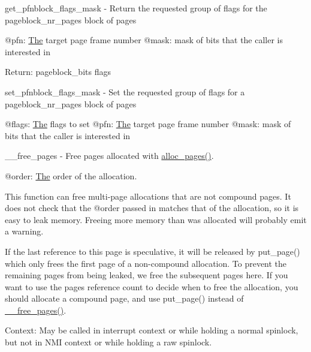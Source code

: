 get\+\_\+pfnblock\+\_\+flags\+\_\+mask -\/ Return the requested group of flags for the pageblock\+\_\+nr\+\_\+pages block of pages

@pfn\+: \mbox{\hyperlink{classThe}{The}} target page frame number @mask\+: mask of bits that the caller is interested in

Return\+: pageblock\+\_\+bits flags

set\+\_\+pfnblock\+\_\+flags\+\_\+mask -\/ Set the requested group of flags for a pageblock\+\_\+nr\+\_\+pages block of pages

@flags\+: \mbox{\hyperlink{classThe}{The}} flags to set @pfn\+: \mbox{\hyperlink{classThe}{The}} target page frame number @mask\+: mask of bits that the caller is interested in

\+\_\+\+\_\+free\+\_\+pages -\/ Free pages allocated with \mbox{\hyperlink{mempolicy_8c_add7a36e6a0c552051c3453df754b9c7b}{alloc\+\_\+pages()}}.

@order\+: \mbox{\hyperlink{classThe}{The}} order of the allocation.

This function can free multi-\/page allocations that are not compound pages. It does not check that the @order passed in matches that of the allocation, so it is easy to leak memory. Freeing more memory than was allocated will probably emit a warning.

If the last reference to this page is speculative, it will be released by put\+\_\+page() which only frees the first page of a non-\/compound allocation. To prevent the remaining pages from being leaked, we free the subsequent pages here. If you want to use the page\textquotesingle{}s reference count to decide when to free the allocation, you should allocate a compound page, and use put\+\_\+page() instead of \mbox{\hyperlink{page__alloc_8c_a09a84df4c6cb817075a2eece7c7c0345}{\+\_\+\+\_\+free\+\_\+pages()}}.

Context\+: May be called in interrupt context or while holding a normal spinlock, but not in N\+MI context or while holding a raw spinlock. 